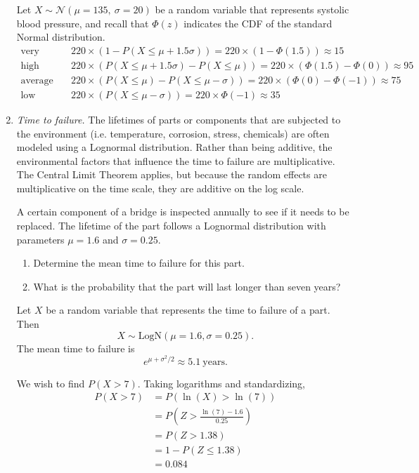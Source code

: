 \begin{enumerate}
\vspace{.1in}
\begin{solution}
\bs Let $X \sim \mathcal{N}(\mu=135,~\sigma=20)$ be a random variable that represents
systolic blood pressure, and recall that $\Phi(z)$ indicates the CDF of the
standard Normal distribution.
\begin{align*}
\text{very high}&
\quad 220\times(1-P(X \leq \mu+1.5\sigma))=220\times(1-\Phi(1.5)) \approx 15 \\
\text{high}&
\quad 220\times (P(X \leq \mu+1.5\sigma)-P(X \leq \mu))=220\times(\Phi(1.5)-\Phi(0)) \approx 95 \\
\text{average}&
\quad 220\times(P(X \leq \mu)-P(X \leq \mu-\sigma))=220\times(\Phi(0)-\Phi(-1))\approx 75 \\
\text{low}&
\quad 220\times(P(X \leq \mu-\sigma))=220\times\Phi(-1) \approx 35
\end{align*}
\end{solution}

\item \emph{Time to failure.} The lifetimes of parts or components
  that are subjected to the environment (i.e. temperature, corrosion,
  stress, chemicals) are often modeled using a Lognormal
  distribution. Rather than being additive, the environmental factors
  that influence the time to failure are multiplicative. The Central
  Limit Theorem applies, but because the random effects are
  multiplicative on the time scale, they are additive on the log
  scale.  

  A certain component of a bridge is inspected annually to see if it
  needs to be replaced. The lifetime of the part follows a Lognormal
  distribution with parameters $\mu=1.6$ and $\sigma=0.25$.

\begin{enumerate}
\item Determine the mean time to failure for this part.
\item What is the probability that the part will last longer
than seven years?
\end{enumerate}

\begin{solution}
  \bs Let $X$ be a random variable that represents the time to failure
of a part. Then  
\[ X \sim \text{LogN}(\mu=1.6,\sigma=0.25). \]
The mean time to failure is
\[ e^{\mu + \sigma^2/2} \approx 5.1~\text{years.} \]

We wish to find $P(X > 7)$. Taking logarithms and standardizing,
\begin{align*}
      P(X > 7) &= P(\ln(X) > \ln(7)) \\
      &= P\left(Z > \frac{\ln(7)-1.6}{0.25}\right) \\
      &= P(Z > 1.38) \\
      &= 1-P(Z \leq 1.38) \\
      &= 0.084
\end{align*}


\end{solution}
\end{enumerate}
